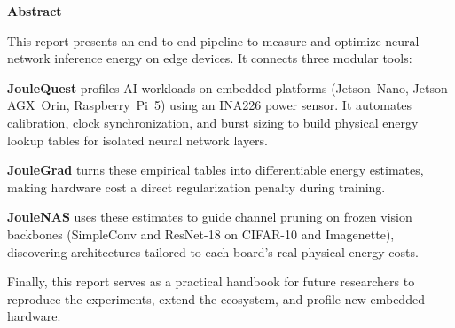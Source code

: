 \clearpage
\thispagestyle{empty}
\vspace*{1.5cm}

\begin{center}
  {\Large\textbf{Abstract}}
\end{center}
\vspace{0.8cm}

\begin{list}{}{%
  \setlength{\leftmargin}{0.5in}%
  \setlength{\rightmargin}{0.5in}%
  \setlength{\listparindent}{0pt}%
  \setlength{\itemindent}{0pt}%
  \setlength{\parsep}{0.8em}%
}
\item\relax

This report presents an end-to-end pipeline to measure and optimize neural network inference energy on edge devices. It connects three modular tools:

\textbf{JouleQuest} profiles AI workloads on embedded platforms (Jetson~Nano, Jetson AGX~Orin, Raspberry~Pi~5) using an INA226 power sensor. It automates calibration, clock synchronization, and burst sizing to build physical energy lookup tables for isolated neural network layers.

\textbf{JouleGrad} turns these empirical tables into differentiable energy estimates, making hardware cost a direct regularization penalty during training.

\textbf{JouleNAS} uses these estimates to guide channel pruning on frozen vision backbones (SimpleConv and ResNet-18 on CIFAR-10 and Imagenette), discovering architectures tailored to each board's real physical energy costs.

Finally, this report serves as a practical handbook for future researchers to reproduce the experiments, extend the ecosystem, and profile new embedded hardware.

\end{list}

